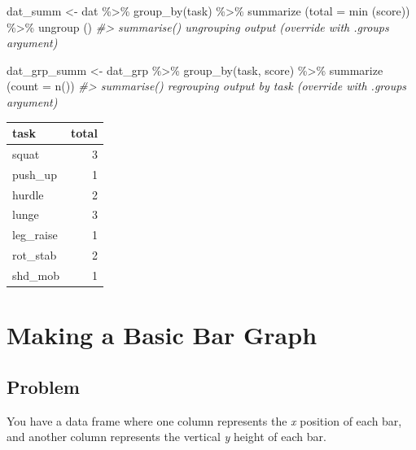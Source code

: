 \documentclass[
]{book}
\newenvironment{Shaded}{\begin{snugshade}}{\end{snugshade}}
\newcommand{\AttributeTok}[1]{\textcolor[rgb]{0.77,0.63,0.00}{#1}}
\newcommand{\CommentTok}[1]{\textcolor[rgb]{0.56,0.35,0.01}{\textit{#1}}}
\newcommand{\FunctionTok}[1]{\textcolor[rgb]{0.00,0.00,0.00}{#1}}
\newcommand{\NormalTok}[1]{#1}
\newcommand{\OtherTok}[1]{\textcolor[rgb]{0.56,0.35,0.01}{#1}}
\newcommand{\SpecialCharTok}[1]{\textcolor[rgb]{0.00,0.00,0.00}{#1}}
\begin{document}
\begin{Shaded}
\begin{Highlighting}[]
\NormalTok{dat\_summ }\OtherTok{\textless{}{-}}\NormalTok{ dat }\SpecialCharTok{\%\textgreater{}\%}
  \FunctionTok{group\_by}\NormalTok{(task) }\SpecialCharTok{\%\textgreater{}\%}
  \FunctionTok{summarize}\NormalTok{ (}\AttributeTok{total =} \FunctionTok{min}\NormalTok{ (score)) }\SpecialCharTok{\%\textgreater{}\%}
  \FunctionTok{ungroup}\NormalTok{ ()}
\CommentTok{\#\textgreater{} \textasciigrave{}summarise()\textasciigrave{} ungrouping output (override with \textasciigrave{}.groups\textasciigrave{} argument)}

\NormalTok{dat\_grp\_summ }\OtherTok{\textless{}{-}}\NormalTok{  dat\_grp }\SpecialCharTok{\%\textgreater{}\%}
  \FunctionTok{group\_by}\NormalTok{(task, score) }\SpecialCharTok{\%\textgreater{}\%}
  \FunctionTok{summarize}\NormalTok{ (}\AttributeTok{count =} \FunctionTok{n}\NormalTok{())  }
\CommentTok{\#\textgreater{} \textasciigrave{}summarise()\textasciigrave{} regrouping output by \textquotesingle{}task\textquotesingle{} (override with \textasciigrave{}.groups\textasciigrave{} argument)}
\end{Highlighting}
\end{Shaded}

\begin{tabular}{l|r}
\hline
task & total\\
\hline
squat & 3\\
\hline
push\_up & 1\\
\hline
hurdle & 2\\
\hline
lunge & 3\\
\hline
leg\_raise & 1\\
\hline
rot\_stab & 2\\
\hline
shd\_mob & 1\\
\hline
\end{tabular}

\hypertarget{BAR-GRAPH-BASIC-BAR}{%
\section{Making a Basic Bar Graph}\label{BAR-GRAPH-BASIC-BAR}}

\hypertarget{problem-15}{%
\subsection{Problem}\label{problem-15}}

You have a data frame where one column represents the \emph{x} position of each bar, and another column represents the vertical \emph{y} height of each bar.
\end{document}
